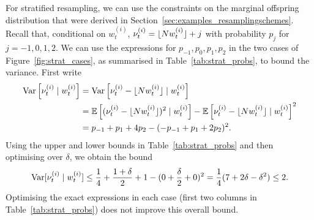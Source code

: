 For stratified resampling, we can use the constraints on the marginal offspring distribution that were derived in Section~\ref{sec:examples_resamplingschemes}. Recall that, conditional on $w_t^{(i)}$, $\nu_t^{(i)} = \lfloor N w_t^{(i)} \rfloor + j$ with probability $p_{j}$ for $j=-1,0,1,2$.
We can use the expressions for $p_{-1},p_0,p_1,p_2$ in the two cases of Figure~\ref{fig:strat_cases}, as summarised in Table~\ref{tab:strat_probs}, to bound the variance. First write
\begin{align}
\operatorname{Var}\left[ \nu_t^{(i)} \mid w_t^{(i)} \right]
&= \operatorname{Var}\left[ \nu_t^{(i)} - \lfloor N w_t^{(i)} \rfloor \mid w_t^{(i)} \right] \notag\\
&= \mathbb{E}\left[ (\nu_t^{(i)} - \lfloor N w_t^{(i)} \rfloor)^2 \mid w_t^{(i)} \right] 
        - \mathbb{E}\left[ \nu_t^{(i)} -\lfloor N w_t^{(i)} \rfloor \mid w_t^{(i)} \right]^2 \notag\\
&= p_{-1} + p_1 + 4p_2 - (-p_{-1} + p_1 + 2p_2)^2 . \label{eq:marg_var_strat}
\end{align}
Using the upper and lower bounds in Table~\ref{tab:strat_probs} and then optimising over $\delta$, we obtain the bound
\begin{equation*}
\operatorname{Var}[ \nu_t^{(i)} \mid w_t^{(i)} ]
\leq \frac{1}{4} + \frac{1+\delta}{2} + 1 - ( 0 + \frac{\delta}{2} + 0 )^2
=\frac{1}{4}(7 + 2\delta - \delta^2)
\leq 2 .
\end{equation*}
Optimising the exact expressions in each case (first two columns in Table~\ref{tab:strat_probs}) does not improve this overall bound.

